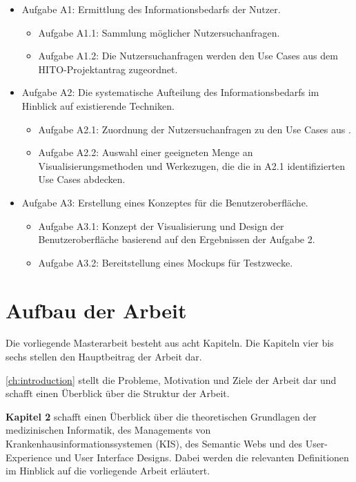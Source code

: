 \begin{itemize}
	\item Aufgabe A1: Ermittlung des Informationsbedarfs der Nutzer.
		\begin{itemize}
		\item Aufgabe A1.1: Sammlung möglicher Nutzersuchanfragen.
		\item Aufgabe A1.2: Die Nutzersuchanfragen werden den Use Cases aus dem HITO-Projektantrag zugeordnet.
		\end{itemize}
	\item Aufgabe A2: Die systematische Aufteilung des Informationsbedarfs im Hinblick auf existierende Techniken.
		\begin{itemize}
		\item Aufgabe A2.1: Zuordnung der Nutzersuchanfragen zu den Use Cases aus \citet{linkeddatavisualization}.
		\item Aufgabe A2.2: Auswahl einer geeigneten Menge an Visualisierungsmethoden und Werkezugen, die die in A2.1 identifizierten Use Cases abdecken.
		\end{itemize}
	\item Aufgabe A3: Erstellung eines Konzeptes für die Benutzeroberfläche.
		\begin{itemize}
		\item Aufgabe A3.1: Konzept der Visualisierung und Design der Benutzeroberfläche basierend auf den Ergebnissen der Aufgabe 2.
		\item Aufgabe A3.2: Bereitstellung eines Mockups für Testzwecke.
		\end{itemize}
\end{itemize}

\section{Aufbau der Arbeit}\label{sec:aufbau}

Die vorliegende Masterarbeit besteht aus acht Kapiteln. Die Kapiteln vier bis sechs stellen den Hauptbeitrag der Arbeit dar. \newline

\cref{ch:introduction} stellt die Probleme, Motivation und Ziele der Arbeit dar und schafft einen Überblick über die Struktur der Arbeit. \newline

\textbf{Kapitel 2} schafft einen Überblick über die theoretischen Grundlagen der medizinischen Informatik, des Managements von Krankenhausinformationssystemen (KIS), des Semantic Webs und des User-Experience und User Interface Designs. Dabei werden die relevanten Definitionen im Hinblick auf die vorliegende Arbeit erläutert.  \newline

